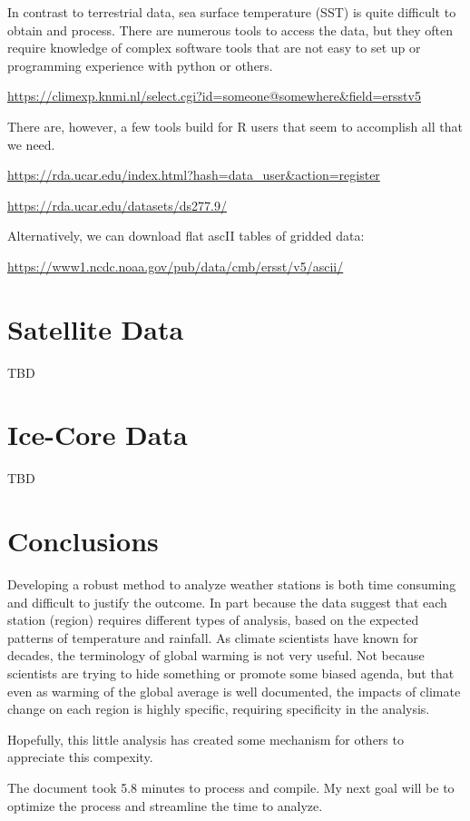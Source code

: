 \documentclass{article}\usepackage[]{graphicx}\usepackage[]{color}
\makeatletter
\newenvironment{kframe}{%
 \def\at@end@of@kframe{}%
 \ifinner\ifhmode%
  \def\at@end@of@kframe{\end{minipage}}%
  \begin{minipage}{\columnwidth}%
 \fi\fi%
 \def\FrameCommand##1{\hskip\@totalleftmargin \hskip-\fboxsep
 \colorbox{shadecolor}{##1}\hskip-\fboxsep
     \hskip-\linewidth \hskip-\@totalleftmargin \hskip\columnwidth}%
 \MakeFramed {\advance\hsize-\width
   \@totalleftmargin\z@ \linewidth\hsize
   \@setminipage}}%
 {\par\unskip\endMakeFramed%
 \at@end@of@kframe}
\newenvironment{knitrout}{}{} %
\makeatother
\begin{document}
In contrast to terrestrial data, sea surface temperature (SST) is quite difficult to obtain and process. There are numerous tools to access the data, but they often require knowledge of complex software tools that are not easy to set up or programming experience with python or others.

\url{https://climexp.knmi.nl/select.cgi?id=someone@somewhere&field=ersstv5}

There are, however, a few tools build for R users that seem to accomplish all that we need. 

\url{https://rda.ucar.edu/index.html?hash=data_user&action=register}

\url{https://rda.ucar.edu/datasets/ds277.9/}

Alternatively, we can download flat ascII tables of gridded data:

\url{https://www1.ncdc.noaa.gov/pub/data/cmb/ersst/v5/ascii/}




\section{Satellite Data}

TBD

\section{Ice-Core Data}

TBD

\section{Conclusions}

Developing a robust method to analyze weather stations is both time consuming and difficult to justify the outcome. In part because the data suggest that each station (region) requires different types of analysis, based on the expected patterns of temperature and rainfall. As climate scientists have known for decades, the terminology of global warming is not very useful. Not because scientists are trying to hide something or promote some biased agenda, but that even as warming of the global average is well documented, the impacts of climate change on each region is highly specific, requiring specificity in the analysis. 

Hopefully, this little analysis has created some mechanism for others to appreciate this compexity. 

\begin{knitrout}
\color{fgcolor}\begin{kframe}


{\ttfamily\noindent\bfseries{}}\end{kframe}
\end{knitrout}

The document took 5.8 minutes to process and compile. My next goal will be to optimize the process and streamline the time to analyze. 
\end{document}
